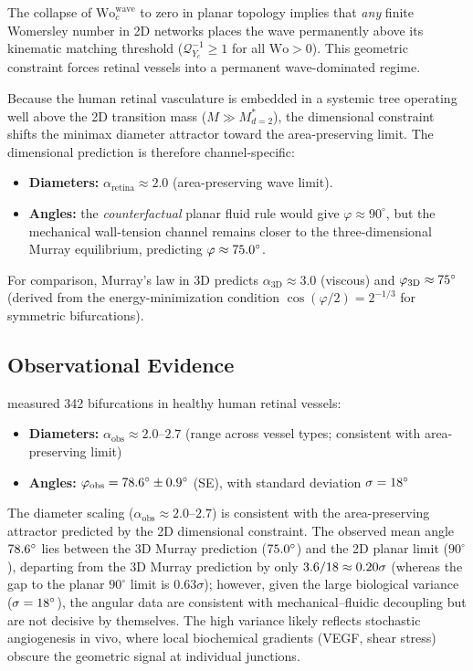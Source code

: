 The collapse of $\mathrm{Wo}_c^{\mathrm{wave}}$ to zero in planar topology
implies that \emph{any} finite Womersley number in 2D networks places the wave
permanently above its kinematic matching threshold ($\mathcal{Q}^{-1}_{Y_c} \ge
1$ for all $\mathrm{Wo} > 0$). This geometric constraint forces retinal vessels
into a permanent wave-dominated regime.

Because the human retinal vasculature is embedded in a systemic tree operating
well above the 2D transition mass ($M \gg M^*_{d=2}$), the dimensional
constraint shifts the minimax diameter attractor toward the area-preserving
limit. The dimensional prediction is therefore channel-specific:
\begin{itemize}
    \item
\textbf{Diameters:} $\alpha_{\text{retina}} \approx 2.0$ (area-preserving
wave limit).
    \item
\textbf{Angles:} the \emph{counterfactual} planar fluid rule would give
$\varphi \approx 90^\circ$, but the mechanical wall-tension channel remains
closer to the three-dimensional Murray equilibrium, predicting $\varphi \approx
75.0^\circ$.
\end{itemize}

For comparison, Murray's law in 3D predicts $\alpha_{\mathrm{3D}} \approx 3.0$
(viscous) and $\varphi_{\mathrm{3D}} \approx 75^\circ$
(derived from the energy-minimization condition $\cos(\varphi/2) = 2^{-1/3}$ for
symmetric bifurcations).

\subsection{Observational Evidence}

\citet{luo2017} measured 342 bifurcations in healthy human retinal vessels:
\begin{itemize}
    \item
\textbf{Diameters:} $\alpha_{\text{obs}} \approx 2.0$--$2.7$ (range across
vessel types; consistent with area-preserving limit)
    \item
\textbf{Angles:} $\varphi_{\text{obs}} = 78.6^\circ \pm
0.9^\circ$ (SE), with standard deviation $\sigma =
18^\circ$
\end{itemize}

The diameter scaling ($\alpha_{\text{obs}} \approx 2.0$--$2.7$) is consistent
with the area-preserving attractor predicted by the 2D dimensional constraint.
The observed mean angle $78.6^\circ$ lies between the 3D Murray
prediction ($75.0^\circ$) and the 2D planar limit
($90^\circ$), departing from the 3D Murray prediction by only
$3.6 / 18 \approx 0.20\sigma$ (whereas the
gap to the planar $90^\circ$ limit is $0.63\sigma$); however, given the large
biological variance ($\sigma = 18^\circ$), the angular data are
consistent with mechanical--fluidic decoupling but are not decisive by
themselves. The high variance likely reflects stochastic angiogenesis in vivo,
where local biochemical gradients (VEGF, shear stress) obscure the geometric
signal at individual junctions.

